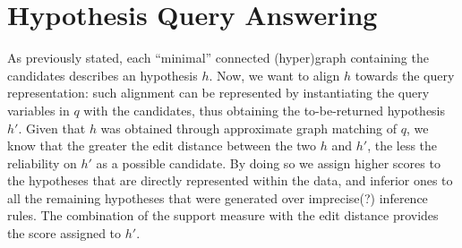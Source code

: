 \section{Hypothesis  Query Answering}\label{sec:synthansw}
As previously stated, each ``minimal'' connected (hyper)graph containing the candidates describes an hypothesis $h$. Now, we want to align $h$ towards the query representation: such alignment can be represented by instantiating the query variables in $q$ with the candidates, thus obtaining the to-be-returned hypothesis $h'$. Given that $h$ was obtained through approximate graph matching of $q$, we know that the greater the edit distance between the two $h$ and $h'$, the less the reliability on $h'$ as a possible candidate. By doing so we assign higher scores to the hypotheses that are directly represented within the data, and inferior ones to all the remaining hypotheses that were generated over imprecise(?) inference rules. The combination of the support measure with the edit distance provides the score assigned to $h'$.